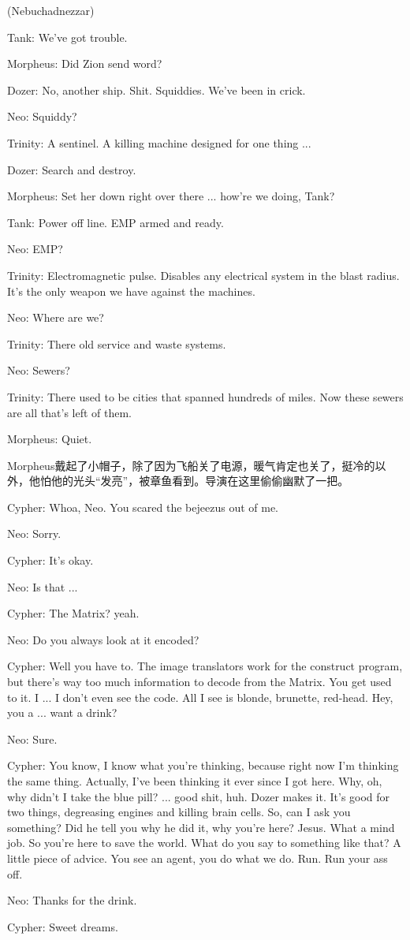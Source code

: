 \documentclass{ctexart}
\newenvironment{myquote}{\color{green} \setlength{\leftskip}{6em} \setlength{\rightskip}{4em} \setlength{\parindent}{-2em}}{\par}
\begin{document}
\begin{myquote}
(Nebuchadnezzar)

Tank: We've got trouble.

Morpheus: Did Zion send word?

Dozer: No, another ship. Shit. Squiddies. We've been in crick.

Neo: Squiddy?

Trinity: A sentinel. A killing machine designed for one thing ...

Dozer: Search and destroy.

Morpheus: Set her down right over there ... how're we doing, Tank?

Tank: Power off line. EMP armed and ready.

Neo: EMP?

Trinity: Electromagnetic pulse. Disables any electrical system in the blast radius. It's the only weapon we have against the machines.

Neo: Where are we?

Trinity: There old service and waste systems.

Neo: Sewers?

Trinity: There used to be cities that spanned hundreds of miles. Now these sewers are all that's left of them.

Morpheus: Quiet.
\end{myquote}

Morpheus戴起了小帽子，除了因为飞船关了电源，暖气肯定也关了，挺冷的以外，他怕他的光头“发亮”，被章鱼看到。导演在这里偷偷幽默了一把。

\begin{myquote}
Cypher: Whoa, Neo. You scared the bejeezus out of me.

Neo: Sorry.

Cypher: It's okay.

Neo: Is that ...

Cypher: The Matrix? yeah.

Neo: Do you always look at it encoded?

Cypher: Well you have to. The image translators work for the construct program, but there's way too much information to decode from the Matrix. You get used to it. I ... I don't even see the code. All I see is blonde, brunette, red-head. Hey, you a ... want a drink?

Neo: Sure.

Cypher: You know, I know what you're thinking, because right now I'm thinking the same thing. Actually, I've been thinking it ever since I got here. Why, oh, why didn't I take the blue pill? ... good shit, huh. Dozer makes it. It's good for two things, degreasing engines and killing brain cells. So, can I ask you something? Did he tell you why he did it, why you're here? Jesus. What a mind job. So you're here to save the world. What do you say to something like that? A little piece of advice. You see an agent, you do what we do. Run. Run your ass off.

Neo: Thanks for the drink.

Cypher: Sweet dreams.
\end{myquote}
\end{document}
